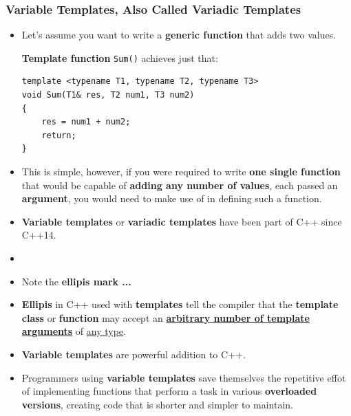 \documentclass[10pt]{article}
\newcommand{\pbreak}{\vspace{30pt}}
\newcommand{\vocab}[1]{\fbox{\textbf{\textit{#1}}}}
\begin{document}
\newpage

\subsubsection{Variable Templates, Also Called Variadic Templates}
\begin{itemize}
	\item Let's assume you want to write a \textbf{generic function} that adds two values.

	\textbf{Template function} \verb|Sum()| achieves just that:
	\begin{verbatim}
template <typename T1, typename T2, typename T3>
void Sum(T1& res, T2 num1, T3 num2)
{
	res = num1 + num2;
	return;
}
	\end{verbatim}

\item This is simple, however, if you were required to write \textbf{one single function} that would be capable of \textbf{adding any number of values}, each passed an \textbf{argument}, you would need to make use of \vocab{variable templates} in defining such a function.

\item \textbf{Variable templates} or \textbf{variadic templates} have been part of C++ since C++14.

\item {}

\end{itemize}

\pbreak

	\begin{tcolorbox}
		\begin{itemize}
			\item Note the \textbf{ellipis mark ...}
			\item \textbf{Ellipis} in C++ used with \textbf{templates} tell the compiler that the \textbf{template class} or \textbf{function} may accept an \underline{\textbf{arbitrary number of template arguments}} of \underline{any type}.
		\end{itemize}
	\end{tcolorbox}

	\pbreak

	\begin{itemize}
		\item \textbf{Variable templates} are powerful addition to C++.
		\item Programmers using \textbf{variable templates} save themselves the repetitive effot of implementing functions that perform a task in various \textbf{overloaded versions}, creating code that is shorter and simpler to maintain.
	\end{itemize}
\end{document}
